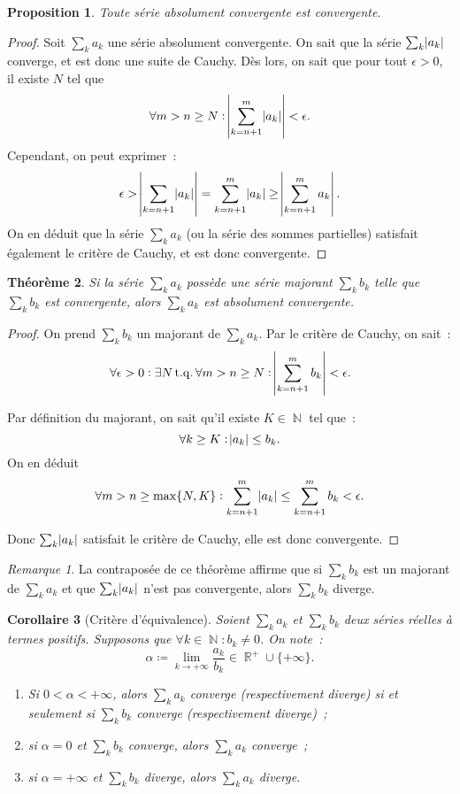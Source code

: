 \documentclass{article}
\DeclareMathOperator{\N}{\mathbb N}
\DeclareMathOperator{\R}{\mathbb R}
\DeclareMathOperator{\tq}{ t.q. }
\newtheorem{thm}{Théorème}[section]
\newtheorem{prp}[thm]{Proposition}
\newtheorem{cor}[thm]{Corollaire}
\theoremstyle{definition}
\theoremstyle{remark}
\newtheorem*{rmq}{Remarque}
\begin{document}
		\begin{prp} Toute série absolument convergente est convergente. \end{prp}

		\begin{proof} Soit $\sum_k a_k$ une série absolument convergente. On sait que la série $\sum_k \abs {a_k}$ converge, et est donc une suite de Cauchy.
		Dès lors, on sait que pour tout $\epsilon > 0$, il existe $N$ tel que~
		\[\forall m > n \geq N : \abs {\sum_{k=n+1}^m\abs {a_k}} < \epsilon.\]
		Cependant, on peut exprimer~:
		\[\epsilon > \abs {\sum_{k=n+1}\abs {a_k}} = \sum_{k=n+1}^m\abs {a_k} \geq \abs {\sum_{k=n+1}^m a_k}.\]
		On en déduit que la série $\sum_k a_k$ (ou la série des sommes partielles) satisfait également le critère de Cauchy, et est donc convergente.
		\end{proof}

		\begin{thm} Si la série $\sum_k a_k$ possède une série majorant $\sum_k b_k$ telle que $\sum_k b_k$ est convergente, alors $\sum_k a_k$ est absolument
		convergente.
		\end{thm}

		\begin{proof} On prend $\sum_k b_k$ un majorant de $\sum_k a_k$. Par le critère de Cauchy, on sait~:
		\[\forall \epsilon > 0 : \exists N \tq \forall m > n \geq N : \abs {\sum_{k=n+1}^m b_k} < \epsilon.\]

		Par définition du majorant, on sait qu'il existe $K \in \N$ tel que~:
		\[\forall k \geq K : \abs {a_k} \leq b_k.\]
		On en déduit
		\[\forall m > n \geq \max \{N, K\} : \sum_{k=n+1}^m \abs {a_k} \leq \sum_{k=n+1}^m b_k < \epsilon.\]

		Donc $\sum_k \abs {a_k}$ satisfait le critère de Cauchy, elle est donc convergente.
		\end{proof}

		\begin{rmq} La contraposée de ce théorème affirme que si $\sum_k b_k$ est un majorant de $\sum_k a_k$ et que $\sum_k \abs{a_k}$ n'est pas convergente,
		alors $\sum_k b_k$ diverge.
		\end{rmq}

		\begin{cor}[Critère d'équivalence] Soient $\sum_k a_k$ et $\sum_k b_k$ deux séries réelles à termes positifs. Supposons que $\forall k \in \N : b_k \neq 0$.
		On note~:
		\[\alpha \coloneqq \lim_{k \to +\infty}\frac {a_k}{b_k} \in \R^+ \cup \{+\infty\}.\]

		\begin{enumerate}
			\item Si $0 < \alpha < +\infty$, alors $\sum_k a_k$ converge (respectivement diverge) si et seulement si $\sum_k b_k$ converge
				(respectivement diverge)~;
			\item si $\alpha = 0$ et $\sum_k b_k$ converge, alors $\sum_k a_k$ converge~;
			\item si $\alpha = +\infty$ et $\sum_k b_k$ diverge, alors $\sum_k a_k$ diverge.
		\end{enumerate}
		\end{cor}
\end{document}
